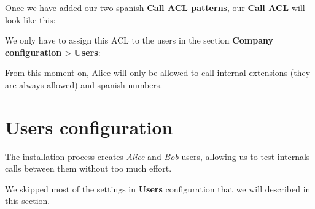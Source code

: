 \documentclass[letterpaper,10pt,english]{sphinxmanual}
\begin{document}
\noindent{}

Once we have added our two spanish \textbf{Call ACL patterns}, our \textbf{Call ACL} will
look like this:

\noindent{}

We only have to assign this ACL to the users in the section \textbf{Company
configuration} \textgreater{} \textbf{Users}:

\noindent{}

From this moment on, Alice will only be allowed to call internal extensions
(they are always allowed) and spanish numbers.


\section{Users configuration}
\label{pbx_features/users::doc}\label{pbx_features/users:users}\label{pbx_features/users:users-configuration}
The installation process creates \emph{Alice} and \emph{Bob} users, allowing us
to test internals calls between them without too much effort.

We skipped most of the settings in \textbf{Users} configuration that we will described
in this section.
\end{document}
